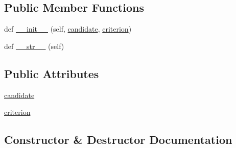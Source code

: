 \subsection*{Public Member Functions}
\begin{DoxyCompactItemize}
\item 
def \hyperlink{classpip_1_1__vendor_1_1resolvelib_1_1resolvers_1_1InconsistentCandidate_a99f6241b8c5759ba623b2da8a71a9df0}{\+\_\+\+\_\+init\+\_\+\+\_\+} (self, \hyperlink{classpip_1_1__vendor_1_1resolvelib_1_1resolvers_1_1InconsistentCandidate_afa67af2348caeb77883fb0cc18d0df3c}{candidate}, \hyperlink{classpip_1_1__vendor_1_1resolvelib_1_1resolvers_1_1InconsistentCandidate_a61c6cba1e1914bd166d05cd8ff207e05}{criterion})
\item 
def \hyperlink{classpip_1_1__vendor_1_1resolvelib_1_1resolvers_1_1InconsistentCandidate_ad75e4f0bb19bdb1500e0fb356ba0516b}{\+\_\+\+\_\+str\+\_\+\+\_\+} (self)
\end{DoxyCompactItemize}
\subsection*{Public Attributes}
\begin{DoxyCompactItemize}
\item 
\hyperlink{classpip_1_1__vendor_1_1resolvelib_1_1resolvers_1_1InconsistentCandidate_afa67af2348caeb77883fb0cc18d0df3c}{candidate}
\item 
\hyperlink{classpip_1_1__vendor_1_1resolvelib_1_1resolvers_1_1InconsistentCandidate_a61c6cba1e1914bd166d05cd8ff207e05}{criterion}
\end{DoxyCompactItemize}


\subsection{Constructor \& Destructor Documentation}
\mbox{\label{classpip_1_1__vendor_1_1resolvelib_1_1resolvers_1_1InconsistentCandidate_a99f6241b8c5759ba623b2da8a71a9df0}} 
